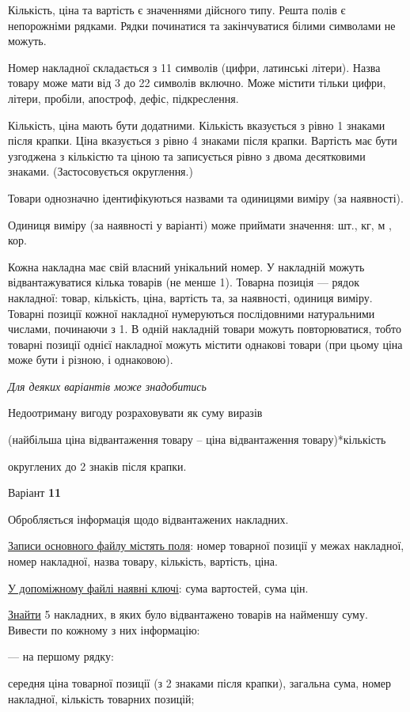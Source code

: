\documentclass[11pt, ukrainian]{article}
\begin{document}
Кількість, ціна та вартість є значеннями дійсного типу.
Решта полів є непорожніми рядками.
Рядки починатися та закінчуватися білими символами не можуть.

Номер накладної складається з 11 символів (цифри, латинські літери).
Назва товару може мати від 3 до 22 символів включно.
Може містити тільки цифри, літери, пробіли, апостроф, дефіс, підкреслення.

Кількість, ціна мають бути додатними.
Кількість вказується з рівно 1 знаками після крапки.
Ціна вказується з рівно 4 знаками після крапки.
Вартість має бути узгоджена з кількістю та ціною та записується рівно з двома десятковими знаками.
(Застосовується округлення.)

Товари однозначно ідентифікуються назвами та одиницями виміру (за наявності).

Одиниця виміру (за наявності у варіанті) може приймати значення: шт., кг, м , кор.

Кожна накладна має свій власний унікальний номер.
У накладній можуть відвантажуватися кілька товарів (не менше 1).
Товарна позиція --- рядок накладної: товар, кількість, ціна, вартість та, за наявності, одиниця виміру.
Товарні позиції кожної накладної нумеруються послідовними натуральними числами, починаючи з 1.
В одній накладній товари можуть повторюватися, 
тобто товарні позиції однієї накладної можуть містити однакові товари 
(при цьому ціна може бути і різною, і однаковою).

\bigskip\textit{Для деяких варіантів може знадобитись}

Недоотриману вигоду розраховувати як суму виразів
{\center (найбільша ціна відвантаження товару – ціна відвантаження товару)*кількість\par}

\bigskip
{\noindent} округлених до 2 знаків після крапки.


\par
\newpage
{\center Варіант  \No \textbf { 11 }\par}
\bigskip
Обробляється інформація щодо відвантажених накладних.

\underline{Записи основного файлу містять поля}: номер товарної позиції у межах накладної, номер накладної, назва товару, кількість, вартість, ціна.

\underline{У допоміжному файлі наявні ключі}: сума вартостей, сума цін.

\underline{Знайти} 5 накладних, в яких було відвантажено товарів на найменшу суму. Вивести по кожному з них інформацію:\par
{\noindent}--- на першому рядку:\par
середня ціна товарної позиції (з 2 знаками після крапки), загальна сума, номер накладної, кількість товарних позицій;
\end{document}
